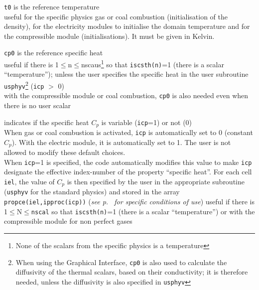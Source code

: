 {{\tt t0} is the reference temperature \\
useful for the specific physics gas or coal combustion (initialisation
of the density), for the electricity modules to initialise the domain
temperature and for the compressible module (initialisations). It must be given
in Kelvin.}

{{\tt cp0} is the reference specific heat\\
useful if there is 1$\leqslant$n$\leqslant$nscaus\footnote{None of the scalars
from the specific physics is a temperature} so that {\tt iscsth(n)}=1
(there is a scalar ``temperature''); unless the user specifies the
specific heat in the user subroutine \texttt{usphyv}\footnote{When using the
Graphical Interface, {\tt cp0} is also used to calculate the diffusivity of the
thermal scalars, based on their conductivity; it is therefore needed, unless the
diffusivity is also specified in \texttt{usphyv}} ({\tt icp} $>$ 0)\\
with the compressible module or coal combustion, {\tt cp0} is also needed even when
there is no user scalar}

{indicates if the specific heat $C_p$ is variable
({\tt icp}=1) or not (0)\\
When gas or coal combustion is activated, {\tt icp} is automatically set to 0
(constant $C_p$). With the electric module, it is automatically set to 1.
The user is not allowed to modify these default choices.\\
When {\tt icp}=1 is specified, the code automatically modifies this value to
make {\tt icp} designate the effective index-number of the property
``specific heat''. For each cell {\tt iel}, the value of
$C_p$ is then specified by the user in the appropriate subroutine
(\texttt{usphyv} for the standard physics) and stored in the array\\
{\tt propce(iel,ipproc(icp))}
({\em see p.~\pageref{sec:prg_propvar} for specific conditions of use})
useful if there is 1$\leqslant$N$\leqslant${\tt nscal} so that {\tt iscsth(n)}=1
(there is a scalar ``temperature'') or with the compressible module for non
perfect gases}

